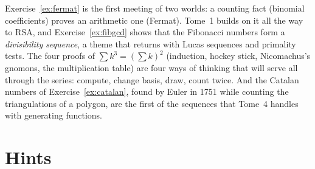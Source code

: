 \begin{beauty}
Exercise~\ref{ex:fermat} is the first meeting of two worlds: a counting fact (binomial coefficients)
proves an arithmetic one (Fermat). Tome~1 builds on it all the way to RSA, and Exercise~\ref{ex:fibgcd}
shows that the Fibonacci numbers form a \emph{divisibility sequence}, a theme that returns with
Lucas sequences and primality tests. The four proofs of $\sum k^3=(\sum k)^2$ (induction, hockey stick, Nicomachus's gnomons, the multiplication table) are
four ways of thinking that will serve all through the series: compute, change basis, draw, count twice. And the Catalan numbers of Exercise~\ref{ex:catalan},
found by Euler in 1751 while counting the triangulations of a polygon, are the first of the sequences that Tome~4 handles with generating functions.
\end{beauty}

\section{Hints}

